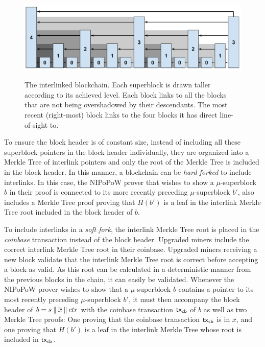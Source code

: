 \begin{figure}[ht]
    \caption{The interlinked blockchain. Each superblock is drawn taller
    according to its achieved level. Each block links to all the blocks that are
    not being overshadowed by their descendants. The most recent (right-most)
    block links to the four blocks it has direct line-of-sight to.}
    \centering
    \includegraphics[width=0.9\columnwidth,keepaspectratio]{figures/level-shadows.pdf}
    \label{fig.hierarchy}
\end{figure}

To ensure the block header is of constant size, instead of including all these
superblock pointers in the block header individually, they are organized into a
Merkle Tree of interlink pointers and only the root of the Merkle Tree is
included in the block header. In this manner, a blockchain can be \emph{hard
forked} to include interlinks. In this case, the NIPoPoW prover that wishes to
show a $\mu$-superblock $b$ in their proof is connected to its more recently
preceding $\mu$-superblock $b'$, also includes a Merkle Tree proof proving that
$H(b')$ is a leaf in the interlink Merkle Tree root included in the block header
of $b$.

To include interlinks in a \emph{soft fork}, the interlink Merkle Tree root is
placed in the \emph{coinbase} transaction instead of the block header. Upgraded
miners include the correct interlink Merkle Tree root in their coinbase.
Upgraded miners receiving a new block validate that the interlink Merkle Tree
root is correct before accepting a block as valid. As this root can be
calculated in a deterministic manner from the previous blocks in the chain, it
can easily be validated. Whenever the NIPoPoW prover wishes to show that a
$\mu$-superblock $b$ contains a pointer to its most recently preceding
$\mu$-superblock $b'$, it must then accompany the block header of $b = s \mathbin{\|}
\overline{x} \mathbin{\|} ctr$ with the coinbase transaction $\mathsf{tx}_{\mathsf{cb}}$ of $b$ as well
as two Merkle Tree proofs: One proving that the coinbase transaction $\mathsf{tx}_{\mathsf{cb}}$
is in $\overline{x}$, and one proving that $H(b')$ is a leaf in the interlink
Merkle Tree whose root is included in $\mathsf{tx}_{\mathsf{cb}}$.


